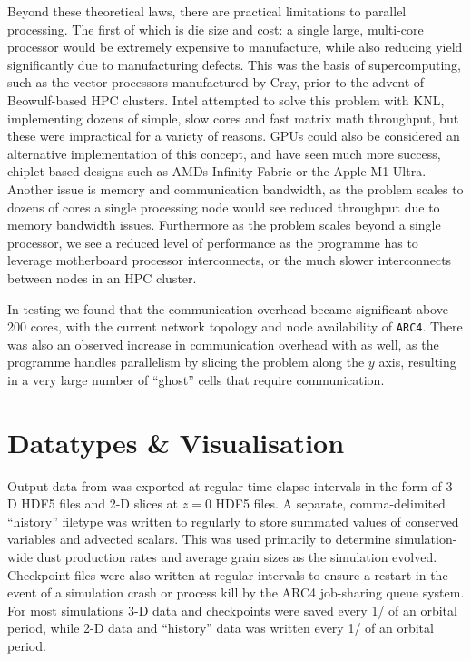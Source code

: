 Beyond these theoretical laws, there are practical limitations to parallel processing.
The first of which is die size and cost: a single large, multi-core processor would be extremely expensive to manufacture, while also reducing yield significantly due to manufacturing defects.
This was the basis of supercomputing, such as the vector processors manufactured by Cray, prior to the advent of Beowulf-based HPC clusters.
Intel attempted to solve this problem with KNL, implementing dozens of simple, slow cores and fast matrix math throughput, but these were impractical for a variety of reasons.
GPUs could also be considered an alternative implementation of this concept, and have seen much more success, chiplet-based designs such as AMDs Infinity Fabric or the Apple M1 Ultra.
Another issue is memory and communication bandwidth, as the problem scales to dozens of cores a single processing node would see reduced throughput due to memory bandwidth issues.
Furthermore as the problem scales beyond a single processor, we see a reduced level of performance as the programme has to leverage motherboard processor interconnects, or the much slower interconnects between nodes in an HPC cluster.

In testing \athena{} we found that the communication overhead became significant above 200 cores, with the current network topology and node availability of \texttt{ARC4}.
There was also an observed increase in communication overhead with \mg{} as well, as the programme handles parallelism by slicing the problem along the $y$ axis, resulting in a very large number of ``ghost'' cells that require communication.


\section{Datatypes \& Visualisation}
\label{sec:visualisation}

Output data from \athena{} was exported at regular time-elapse intervals in the form of 3-D HDF5 files \parencite{hdf5} and 2-D slices at $z=0$ HDF5 files.
A separate, comma-delimited ``history'' filetype was written to regularly to store summated values of conserved variables and advected scalars.
This was used primarily to determine simulation-wide dust production rates and average grain sizes as the simulation evolved.
Checkpoint files were also written at regular intervals to ensure a restart in the event of a simulation crash or process kill by the ARC4 job-sharing queue system.
For most simulations 3-D data and checkpoints were saved every 1/ of an orbital period, while 2-D data and ``history'' data was written every 1/ of an orbital period.


